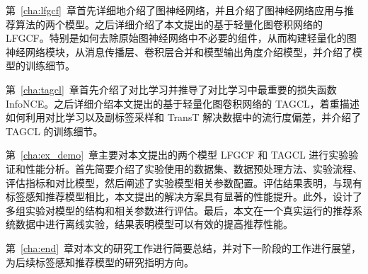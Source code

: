 第~\ref{cha:lfgcf}~章首先详细地介绍了图神经网络，并且介绍了图神经网络应用与推荐算法的两个模型。之后详细介绍了本文提出的基于轻量化图卷积网络的 LFGCF。特别是如何去除原始图神经网络中不必要的组件，从而构建轻量化的图神经网络模块，从消息传播层、卷积层合并和模型输出角度介绍模型，并介绍了模型的训练细节。

第~\ref{cha:tagcl}~章首先介绍了对比学习并推导了对比学习中最重要的损失函数 InfoNCE。之后详细介绍本文提出的基于轻量化图卷积网络的 TAGCL，着重描述如何利用对比学习以及副标签采样和 TransT 解决数据中的流行度偏差，并介绍了 TAGCL 的训练细节。

第~\ref{cha:ex_demo}~章主要对本文提出的两个模型 LFGCF 和 TAGCL 进行实验验证和性能分析。首先简要介绍了实验使用的数据集、数据预处理方法、实验流程、评估指标和对比模型，然后阐述了实验模型相关参数配置。评估结果表明，与现有标签感知推荐模型相比，本文提出的解决方案具有显著的性能提升。此外，设计了多组实验对模型的结构和相关参数进行评估。最后，本文在一个真实运行的推荐系统数据中进行离线实验，结果表明模型可以有效的提高推荐性能。

第~\ref{cha:end}~章对本文的研究工作进行简要总结，并对下一阶段的工作进行展望，为后续标签感知推荐模型的研究指明方向。

